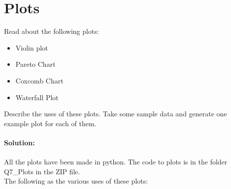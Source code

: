 \documentclass[12pt]{article}
\begin{document}
\section{Plots}
Read about the following plots: \\
\begin{itemize}
    \item Violin plot
    \item Pareto Chart
    \item Coxcomb Chart
    \item Waterfall Plot
\end{itemize}
Describe the uses of these plots. Take some sample data and generate one example plot for each
of them.\\ \\
\textbf{Solution: }\\ \\
All the plots have been made in python. The code to plots is in the folder Q7\_Plots in the ZIP file.\\
The following as the various uses of these plots: \\
\end{document}
